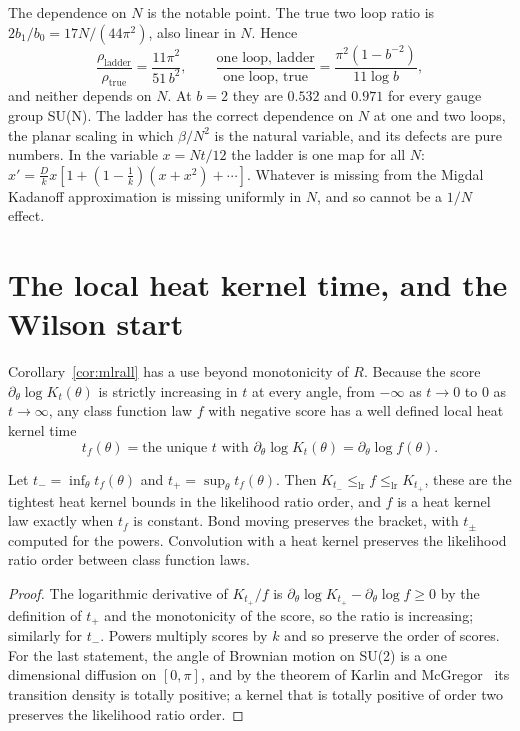 The dependence on $N$ is the notable point. The true two loop ratio is $2b_1/b_0=17N/(44\pi^2)$, also linear in $N$. Hence
\[
\frac{\rho_{\mathrm{ladder}}}{\rho_{\mathrm{true}}}=\frac{11\pi^2}{51\,b^2},\qquad\frac{\text{one loop, ladder}}{\text{one loop, true}}=\frac{\pi^2(1-b^{-2})}{11\log b},
\]
and neither depends on $N$. At $b=2$ they are $0.532$ and $0.971$ for every gauge group SU(N). The ladder has the correct dependence on $N$ at one and two loops, the planar scaling in which $\beta/N^2$ is the natural variable, and its defects are pure numbers. In the variable $x=Nt/12$ the ladder is one map for all $N$: $x'=\frac Dkx[1+(1-\frac1k)(x+x^2)+\cdots]$. Whatever is missing from the Migdal Kadanoff approximation is missing uniformly in $N$, and so cannot be a $1/N$ effect.

\section{The local heat kernel time, and the Wilson start}

Corollary~\ref{cor:mlrall} has a use beyond monotonicity of $R$. Because the score $\partial_\theta\log K_t(\theta)$ is strictly increasing in $t$ at every angle, from $-\infty$ as $t\to0$ to $0$ as $t\to\infty$, any class function law $f$ with negative score has a well defined local heat kernel time
\[
t_f(\theta)=\text{the unique }t\text{ with }\partial_\theta\log K_t(\theta)=\partial_\theta\log f(\theta).
\]

\begin{proposition}\label{prop:localtime}
Let $t_-=\inf_\theta t_f(\theta)$ and $t_+=\sup_\theta t_f(\theta)$. Then $K_{t_-}\le_{\mathrm{lr}}f\le_{\mathrm{lr}}K_{t_+}$, these are the tightest heat kernel bounds in the likelihood ratio order, and $f$ is a heat kernel law exactly when $t_f$ is constant. Bond moving preserves the bracket, with $t_\pm$ computed for the powers. Convolution with a heat kernel preserves the likelihood ratio order between class function laws.
\end{proposition}

\begin{proof}
The logarithmic derivative of $K_{t_+}/f$ is $\partial_\theta\log K_{t_+}-\partial_\theta\log f\ge0$ by the definition of $t_+$ and the monotonicity of the score, so the ratio is increasing; similarly for $t_-$. Powers multiply scores by $k$ and so preserve the order of scores. For the last statement, the angle of Brownian motion on SU(2) is a one dimensional diffusion on $[0,\pi]$, and by the theorem of Karlin and McGregor~\cite{KM59} its transition density is totally positive; a kernel that is totally positive of order two preserves the likelihood ratio order.
\end{proof}

